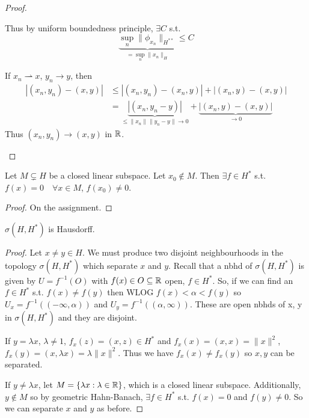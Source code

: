 \begin{proof}
\begin{description}
        Thus by uniform boundedness principle, $\exists C$ s.t. 
        \[
            \underbrace{\sup_{n} \| \phi_{x_n} \|_{H^{**}}}_{= \sup_n \| x_n \|_H} \leq C 
        \]  

        \item[(2)]
        If $x_n \rightharpoonup x$, $y_n \to y$, then
        \begin{align*}
            \left| (x_n, y_n) - (x, y) \right| &\leq \left| (x_n, y_n) - (x_n, y) \right| + \left| (x_n, y) - (x, y) \right| \\
            &= \underbrace{\left| (x_n, y_n - y) \right|}_{\leq \| x_n \| \| y_n - y \| \to 0} + \underbrace{\left| (x_n, y) - (x, y) \right|}_{\to 0}
        \end{align*}
            Thus $(x_n, y_n) \to (x, y)$ in $\mathbb{R}$. \qedhere
    \end{description} 
\end{proof}

\begin{thm}
    Let $M \subsetneq H$ be a closed linear subspace. Let $x_0 \not\in M$. Then
    $\exists f \in H^*$ s.t. $f(x) = 0 \quad \forall x \in M$, $f(x_0) \neq 0$.   
\end{thm}
\begin{proof}
    On the assignment.
\end{proof}
\begin{prop}
    $\sigma(H, H^*)$ is Hausdorff.
\end{prop}
\begin{proof}
    Let $x \neq y \in H$. We must produce two disjoint neighbourhoods in the topology
    $\sigma(H, H^*)$ which separate $x$ and $y$. Recall that a nbhd of $\sigma(H, H^*)$ is
    given by $U = f^{-1}(O)$ with $f(x) \in O \subseteq \mathbb{R}$ open, $f \in H^*$. So, if we can
    find an $f \in H^*$ s.t. $f(x) \neq f(y)$ then WLOG $f(x) < \alpha < f(y)$ so 
    $U_x = f^{-1}((-\infty, \alpha))$ and $U_y = f^{-1}((\alpha, \infty))$. These are open 
    nbhds of x, y in $\sigma(H, H^*)$ and they are disjoint. 
    
    If $y = \lambda x$, $\lambda \neq 1$, $f_x(z) = (x, z) \in H^*$ and $f_x(x) = (x, x) = \| x \|^2$,
    $f_x(y) = (x, \lambda x) = \lambda \| x \|^2 $. Thus we have $f_x(x) \neq f_x(y)$ so
    $x, y$ can be separated. 
    
    If $y \neq \lambda x$, let $M = \{ \lambda x : \lambda \in \mathbb{R} \}$, which is a closed linear
    subspace. Additionally, $y \not \in M$ so by geometric Hahn-Banach, $\exists f \in H^*$
    s.t. $f(x) = 0$ and $f(y) \neq 0$. So we can separate $x$ and $y$ as before. \qedhere       
\end{proof}

